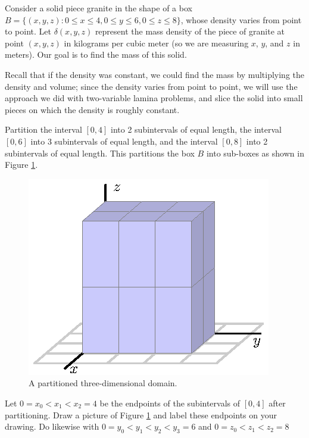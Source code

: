 \begin{pa} \label{PA:11.7} Consider a solid piece granite in the shape of a box $B = \{(x,y,z) : 0 \leq x \leq 4, 0 \leq y \leq 6, 0 \leq z \leq 8\}$, whose density varies from point to point. Let $\delta(x, y, z)$ represent the mass density of the piece of granite at point $(x,y,z)$ in kilograms per cubic meter (so we are measuring $x$, $y$, and $z$ in meters). Our goal is to find the mass of this solid. 

Recall that if the density was constant, we could find the mass by multiplying the density and volume;  since the density varies from point to point, we will use the approach we did with two-variable lamina problems, and slice the solid into small pieces on which the density is roughly constant.

Partition the interval $[0,4]$ into 2 subintervals of equal length, the interval $[0,6]$ into 3 subintervals of equal length, and the interval $[0,8]$ into 2 subintervals of equal length. This partitions the box $B$ into sub-boxes as shown in Figure \ref{F:11.7.Box_domain}.
\begin{figure}[h]
\begin{center}
  \includegraphics{figures/fig_11_7_preview.eps}
\end{center}
\caption{A partitioned three-dimensional domain.}
\label{F:11.7.Box_domain}
\end{figure}
    \ba
    \item Let $0=x_0 < x_1 < x_2=4$ be the endpoints of the subintervals of $[0,4]$ after partitioning. Draw a picture of Figure \ref{F:11.7.Box_domain} and label these endpoints on your drawing. Do likewise with $0=y_0 < y_1 < y_2 < y_3=6$ and $0=z_0 < z_1 < z_2=8$
    

\end{pa}
